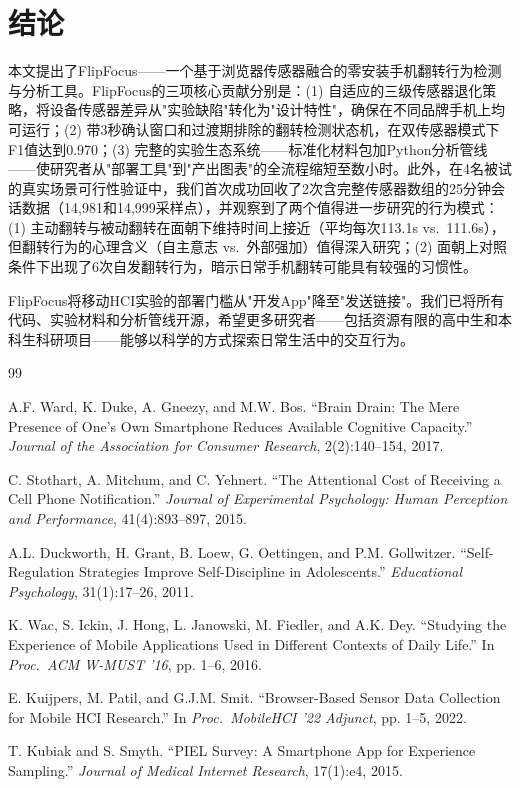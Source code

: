 \documentclass[12pt,a4paper]{ctexart}
\begin{document}
\section{结论}

本文提出了FlipFocus——一个基于浏览器传感器融合的零安装手机翻转行为检测与分析工具。FlipFocus的三项核心贡献分别是：(1) 自适应的三级传感器退化策略，将设备传感器差异从"实验缺陷"转化为"设计特性"，确保在不同品牌手机上均可运行；(2) 带3秒确认窗口和过渡期排除的翻转检测状态机，在双传感器模式下F1值达到0.970；(3) 完整的实验生态系统——标准化材料包加Python分析管线——使研究者从"部署工具"到"产出图表"的全流程缩短至数小时。此外，在4名被试的真实场景可行性验证中，我们首次成功回收了2次含完整传感器数组的25分钟会话数据（14,981和14,999采样点），并观察到了两个值得进一步研究的行为模式：(1) 主动翻转与被动翻转在面朝下维持时间上接近（平均每次113.1s vs.\ 111.6s），但翻转行为的心理含义（自主意志 vs.\ 外部强加）值得深入研究；(2) 面朝上对照条件下出现了6次自发翻转行为，暗示日常手机翻转可能具有较强的习惯性。

FlipFocus将移动HCI实验的部署门槛从"开发App"降至"发送链接"。我们已将所有代码、实验材料和分析管线开源，希望更多研究者——包括资源有限的高中生和本科生科研项目——能够以科学的方式探索日常生活中的交互行为。

\begin{thebibliography}{99}

A.F. Ward, K. Duke, A. Gneezy, and M.W. Bos.
``Brain Drain: The Mere Presence of One's Own Smartphone Reduces Available Cognitive Capacity.''
\emph{Journal of the Association for Consumer Research}, 2(2):140--154, 2017.

C. Stothart, A. Mitchum, and C. Yehnert.
``The Attentional Cost of Receiving a Cell Phone Notification.''
\emph{Journal of Experimental Psychology: Human Perception and Performance}, 41(4):893--897, 2015.

A.L. Duckworth, H. Grant, B. Loew, G. Oettingen, and P.M. Gollwitzer.
``Self-Regulation Strategies Improve Self-Discipline in Adolescents.''
\emph{Educational Psychology}, 31(1):17--26, 2011.

K. Wac, S. Ickin, J. Hong, L. Janowski, M. Fiedler, and A.K. Dey.
``Studying the Experience of Mobile Applications Used in Different Contexts of Daily Life.''
In \emph{Proc.\ ACM W-MUST '16}, pp. 1--6, 2016.

E. Kuijpers, M. Patil, and G.J.M. Smit.
``Browser-Based Sensor Data Collection for Mobile HCI Research.''
In \emph{Proc.\ MobileHCI '22 Adjunct}, pp. 1--5, 2022.

T. Kubiak and S. Smyth.
``PIEL Survey: A Smartphone App for Experience Sampling.''
\emph{Journal of Medical Internet Research}, 17(1):e4, 2015.

\end{thebibliography}
\end{document}
